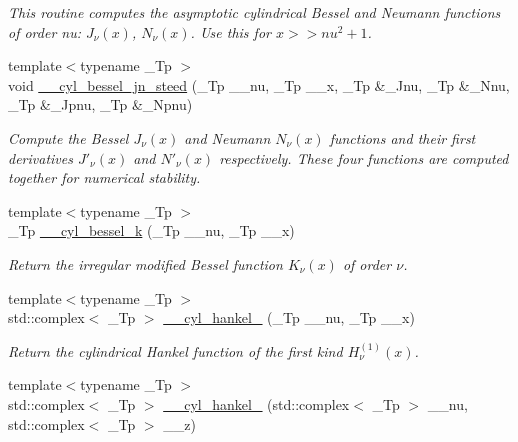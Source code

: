 \begin{DoxyCompactItemize}
\begin{DoxyCompactList}\small\item\em This routine computes the asymptotic cylindrical Bessel and Neumann functions of order nu\+: $ J_{\nu}(x) $, $ N_{\nu}(x) $. Use this for $ x >> nu^2 + 1 $. \end{DoxyCompactList}\item 
{\footnotesize template$<$typename \+\_\+\+Tp $>$ }\\void \hyperlink{namespacestd_1_1____detail_aec912bf99c46ec418163625de9187371}{\+\_\+\+\_\+cyl\+\_\+bessel\+\_\+jn\+\_\+steed} (\+\_\+\+Tp \+\_\+\+\_\+nu, \+\_\+\+Tp \+\_\+\+\_\+x, \+\_\+\+Tp \&\+\_\+\+Jnu, \+\_\+\+Tp \&\+\_\+\+Nnu, \+\_\+\+Tp \&\+\_\+\+Jpnu, \+\_\+\+Tp \&\+\_\+\+Npnu)
\begin{DoxyCompactList}\small\item\em Compute the Bessel $ J_\nu(x) $ and Neumann $ N_\nu(x) $ functions and their first derivatives $ J'_\nu(x) $ and $ N'_\nu(x) $ respectively. These four functions are computed together for numerical stability. \end{DoxyCompactList}\item 
{\footnotesize template$<$typename \+\_\+\+Tp $>$ }\\\+\_\+\+Tp \hyperlink{namespacestd_1_1____detail_ac9152f2369a18aa795fe24ccfa6dcf12}{\+\_\+\+\_\+cyl\+\_\+bessel\+\_\+k} (\+\_\+\+Tp \+\_\+\+\_\+nu, \+\_\+\+Tp \+\_\+\+\_\+x)
\begin{DoxyCompactList}\small\item\em Return the irregular modified Bessel function $ K_{\nu}(x) $ of order $ \nu $. \end{DoxyCompactList}\item 
{\footnotesize template$<$typename \+\_\+\+Tp $>$ }\\std\+::complex$<$ \+\_\+\+Tp $>$ \hyperlink{namespacestd_1_1____detail_aac3fc60c1210e8f2ae3cf05cdc7bad84}{\+\_\+\+\_\+cyl\+\_\+hankel\+\_} (\+\_\+\+Tp \+\_\+\+\_\+nu, \+\_\+\+Tp \+\_\+\+\_\+x)
\begin{DoxyCompactList}\small\item\em Return the cylindrical Hankel function of the first kind $ H^{(1)}_\nu(x) $. \end{DoxyCompactList}\item 
{\footnotesize template$<$typename \+\_\+\+Tp $>$ }\\std\+::complex$<$ \+\_\+\+Tp $>$ \hyperlink{namespacestd_1_1____detail_a9904b6007ef78ef777ac8345f6e47960}{\+\_\+\+\_\+cyl\+\_\+hankel\+\_} (std\+::complex$<$ \+\_\+\+Tp $>$ \+\_\+\+\_\+nu, std\+::complex$<$ \+\_\+\+Tp $>$ \+\_\+\+\_\+z)

\end{DoxyCompactItemize}
